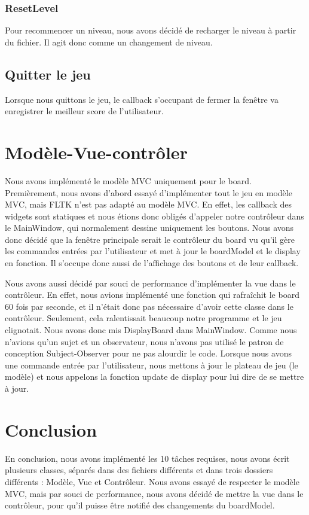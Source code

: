 \documentclass[utf8]{article}
\begin{document}
\begin{large}
\subsubsection{ResetLevel}
\indent
\par
Pour recommencer un niveau, nous avons décidé de recharger le niveau à partir du
fichier. Il agit donc comme un changement de niveau.
\subsection{Quitter le jeu}
\indent
\par
Lorsque nous quittons le jeu, le callback s'occupant de fermer la fenêtre va
enregistrer le meilleur score de l'utilisateur.
\par

\section{Modèle-Vue-contrôler}
\indent
\par
Nous avons implémenté le modèle MVC uniquement pour le board. Premièrement, nous
avons d'abord essayé d'implémenter tout le jeu en modèle MVC, mais FLTK n'est
pas adapté au modèle MVC. En effet, les callback des widgets sont statiques et
nous étions donc obligés d'appeler notre contrôleur dans le MainWindow, qui
normalement dessine uniquement les boutons. Nous avons donc décidé que la
fenêtre principale serait le contrôleur du board vu qu'il gère les commandes
entrées par l'utilisateur et met à jour le boardModel et le display en fonction.
Il s'occupe donc aussi de l'affichage des boutons et de leur callback.
\par
Nous avons aussi décidé par souci de performance d'implémenter la vue dans le
contrôleur. En effet, nous avions implémenté une fonction qui rafraîchit le
board 60 fois par seconde, et il n'était donc pas nécessaire d'avoir cette
classe dans le contrôleur. Seulement, cela ralentissait beaucoup notre programme
et le jeu clignotait. Nous avons donc mis DisplayBoard dans MainWindow. Comme
nous n'avions qu'un sujet et un observateur, nous n'avons pas utilisé le patron
de conception Subject-Observer pour ne pas alourdir le code. Lorsque nous avons
une commande entrée par l'utilisateur, nous mettons à jour le plateau de jeu (le
modèle) et nous appelons la fonction update de display pour lui dire de se
mettre à jour. 
\par
\section{Conclusion}
\indent
\par
En conclusion, nous avons implémenté les 10 tâches requises, nous avons écrit
plusieurs classes, séparés dans des fichiers différents et dans trois dossiers
différents : Modèle, Vue et Contrôleur. Nous avons essayé de respecter le modèle
MVC, mais par souci de performance, nous avons décidé de mettre la vue dans le
contrôleur, pour qu'il puisse être notifié des changements du boardModel.
\par

\end{large}
\end{document}
